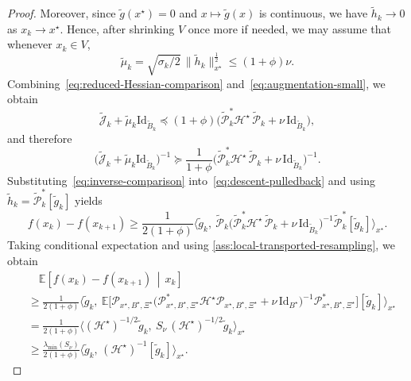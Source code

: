 \documentclass[final,onefignum,onetabnum]{siamart250211}
\begin{document}
\begin{proof}
Moreover, since $\widetilde g(x^\star)=0$ and $x\mapsto \widetilde g(x)$ is continuous, we have $\widetilde h_k\to 0$ as $x_k\to x^\star$. Hence, after shrinking $V$ once more if needed, we may assume that whenever $x_k\in V$,
\begin{equation}
\tilde{\mu}_k
=
\sqrt{\sigma_k/2}\,\|\widetilde h_k\|_{x^\star}^{\frac{1}{2}}
\le
(1+\phi)\nu.
\label{eq:augmentation-small}
\end{equation}
Combining~\eqref{eq:reduced-Hessian-comparison} and~\eqref{eq:augmentation-small}, we obtain
\[
\widetilde{\mathcal J}_k+\tilde{\mu}_k\mathrm{Id}_{\widetilde B_k}
\preceq
(1+\phi)\bigl(\widetilde{\mathcal P}_k^*\mathcal{H}^\star\,\widetilde{\mathcal P}_k+\nu\,\mathrm{Id}_{\widetilde B_k}\bigr),
\]
and therefore
\begin{equation}
\bigl(\widetilde{\mathcal J}_k+\tilde{\mu}_k\mathrm{Id}_{\widetilde B_k}\bigr)^{-1}
\succeq
\frac{1}{1+\phi}
\bigl(\widetilde{\mathcal P}_k^*\mathcal{H}^\star\,\widetilde{\mathcal P}_k+\nu\,\mathrm{Id}_{\widetilde B_k}\bigr)^{-1}.
\label{eq:inverse-comparison}
\end{equation}
Substituting~\eqref{eq:inverse-comparison} into~\eqref{eq:descent-pulledback} and using $\widetilde h_k=\widetilde{\mathcal P}_k^*[\widetilde g_k]$ yields
\[
f(x_k)-f(x_{k+1})
\ge
\frac{1}{2(1+\phi)}
\Big\langle
\widetilde g_k,\
\widetilde{\mathcal P}_k
\bigl(\widetilde{\mathcal P}_k^*\mathcal{H}^\star\,\widetilde{\mathcal P}_k+\nu\,\mathrm{Id}_{\widetilde B_k}\bigr)^{-1}
\widetilde{\mathcal P}_k^*[\widetilde g_k]
\Big\rangle_{x^\star}.
\]
Taking conditional expectation and using \cref{ass:local-transported-resampling}, we obtain
\begin{align}
&\quad \mathbb E\!\left[f(x_k)-f(x_{k+1})\,\middle|\,x_k\right] \\
&\ge
\frac{1}{2(1+\phi)}
\Big\langle
\widetilde g_k,\
\mathbb E\Big[
\mathcal P_{x^\star,B^\star,\Xi^\star}
\bigl(
\mathcal P_{x^\star,B^\star,\Xi^\star}^{*}\mathcal{H}^\star\mathcal P_{x^\star,B^\star,\Xi^\star}
+\nu\,\mathrm{Id}_{B^\star}
\bigr)^{-1}
\mathcal P_{x^\star,B^\star,\Xi^\star}^{*}
\Big][\widetilde g_k]
\Big\rangle_{x^\star} \nonumber\\
&=
\frac{1}{2(1+\phi)}
\Big\langle
(\mathcal{H}^\star)^{-1/2}\widetilde g_k,\
S_{\nu}\,(\mathcal{H}^\star)^{-1/2}\widetilde g_k
\Big\rangle_{x^\star} \nonumber\\
&\ge
\frac{\lambda_{\min}(S_{\nu})}{2(1+\phi)}
\big\langle
\widetilde g_k,\,
(\mathcal{H}^\star)^{-1}[\widetilde g_k]
\big\rangle_{x^\star}.
\label{eq:expected-descent-pulledback}

\end{align}
\end{proof}
\end{document}
